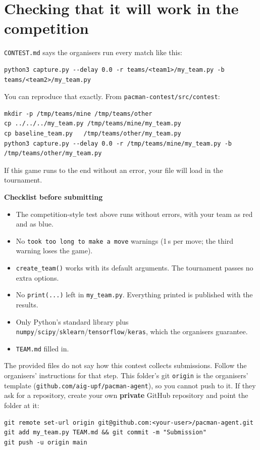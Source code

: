\documentclass[11pt,a4paper]{article}
\newcommand{\p}[1]{\nolinkurl{#1}}  %
\begin{document}
\section{Checking that it will work in the competition}

\texttt{CONTEST.md} says the organisers run every match like this:
\begin{lstlisting}
python3 capture.py --delay 0.0 -r teams/<team1>/my_team.py -b teams/<team2>/my_team.py
\end{lstlisting}
You can reproduce that exactly. From \p{pacman-contest/src/contest}:
\begin{lstlisting}
mkdir -p /tmp/teams/mine /tmp/teams/other
cp ../../../my_team.py /tmp/teams/mine/my_team.py
cp baseline_team.py   /tmp/teams/other/my_team.py
python3 capture.py --delay 0.0 -r /tmp/teams/mine/my_team.py -b /tmp/teams/other/my_team.py
\end{lstlisting}
If this game runs to the end without an error, your file will load in the tournament.

\textbf{Checklist before submitting}
\begin{itemize}[label=$\square$]
  \item The competition-style test above runs without errors, with your team as red and as blue.
  \item No \texttt{took too long to make a move} warnings (1\,s per move; the third warning loses the game).
  \item \texttt{create\_team()} works with its default arguments. The tournament passes no extra options.
  \item No \texttt{print(...)} left in \texttt{my\_team.py}. Everything printed is published with the results.
  \item Only Python's standard library plus \texttt{numpy}/\texttt{scipy}/\texttt{sklearn}/\texttt{tensorflow}/\texttt{keras}, which the organisers guarantee.
  \item \texttt{TEAM.md} filled in.
\end{itemize}

\begin{careful}
The provided files do not say how this contest collects submissions. Follow the organisers' instructions for that step.
This folder's git \texttt{origin} is the organisers' template (\p{github.com/aig-upf/pacman-agent}), so you cannot push to it.
If they ask for a repository, create your own \textbf{private} GitHub repository and point the folder at it:
\begin{lstlisting}
git remote set-url origin git@github.com:<your-user>/pacman-agent.git
git add my_team.py TEAM.md && git commit -m "Submission"
git push -u origin main
\end{lstlisting}
\end{careful}
\end{document}
